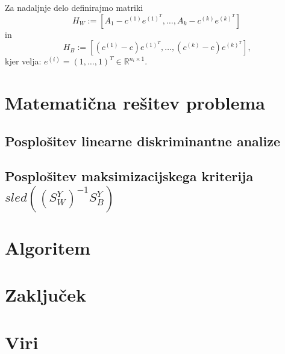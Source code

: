 \documentclass[mat1]{article}
\begin{document}
Za nadaljnje delo definirajmo matriki
$$H_W := [A_1 - c^{(1)}e^{(1)^T}, \ldots, A_k - c^{(k)}e^{(k)^T}]$$
in
$$H_B := [(c^{(1)} - c)e^{(1)^T}, \ldots,(c^{(k)} - c) e^{(k)^T}] \text{,}$$
kjer velja:
$e^{(i)} = (1,\ldots, 1) ^T \in \mathbb{R}^{ n_i \times 1 } \text{.}$

\section{Matematična rešitev problema}
\subsection{Posplošitev linearne diskriminantne analize}

\subsection{Posplošitev maksimizacijskega kriterija $sled((S_W^Y)^{-1}S_B^Y)$}

\section{Algoritem}

\section{Zaključek}

\section{Viri}
\end{document}
